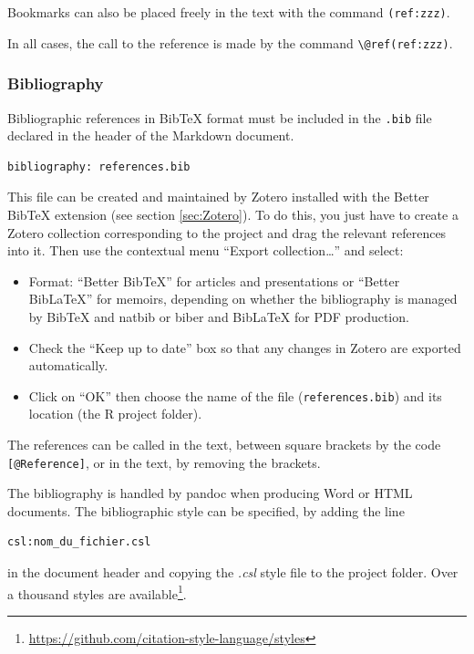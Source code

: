 \documentclass[
  12pt,
  american,
  a4paper,
  extrafontsizes,onecolumn,openright
  ]{memoir}
\providecommand{\tightlist}{%
  \setlength{\itemsep}{0pt}\setlength{\parskip}{0pt}}
\begin{document}
Bookmarks can also be placed freely in the text with the command \texttt{(ref:zzz)}.

In all cases, the call to the reference is made by the command \texttt{\textbackslash{}@ref(ref:zzz)}.

\subsubsection{Bibliography}\label{bibliography}

Bibliographic references in BibTeX format must be included in the \texttt{.bib} file declared in the header of the Markdown document.

\begin{verbatim}
bibliography: references.bib
\end{verbatim}

This file can be created and maintained by Zotero installed with the Better BibTeX extension (see section \ref{sec:Zotero}).
To do this, you just have to create a Zotero collection corresponding to the project and drag the relevant references into it.
Then use the contextual menu \enquote{Export collection\ldots{}} and select:

\begin{itemize}
\tightlist
\item
  Format: \enquote{Better BibTeX} for articles and presentations or \enquote{Better BibLaTeX} for memoirs, depending on whether the bibliography is managed by BibTeX and natbib or biber and BibLaTeX for PDF production.
\item
  Check the \enquote{Keep up to date} box so that any changes in Zotero are exported automatically.
\item
  Click on \enquote{OK} then choose the name of the file (\texttt{references.bib}) and its location (the R project folder).
\end{itemize}

The references can be called in the text, between square brackets by the code \texttt{{[}@Reference{]}}, or in the text, by removing the brackets.

The bibliography is handled by pandoc when producing Word or HTML documents.
The bibliographic style can be specified, by adding the line

\begin{verbatim}
csl:nom_du_fichier.csl
\end{verbatim}

in the document header and copying the \emph{.csl} style file to the project folder.
Over a thousand styles are available\footnote{\url{https://github.com/citation-style-language/styles}}.
\end{document}
